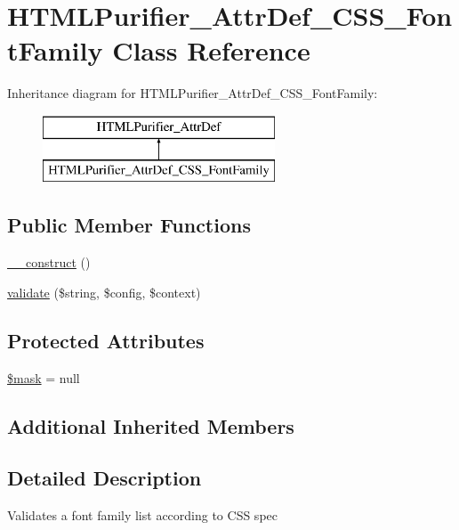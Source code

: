 \hypertarget{classHTMLPurifier__AttrDef__CSS__FontFamily}{\section{H\+T\+M\+L\+Purifier\+\_\+\+Attr\+Def\+\_\+\+C\+S\+S\+\_\+\+Font\+Family Class Reference}
\label{classHTMLPurifier__AttrDef__CSS__FontFamily}
}
Inheritance diagram for H\+T\+M\+L\+Purifier\+\_\+\+Attr\+Def\+\_\+\+C\+S\+S\+\_\+\+Font\+Family\+:\begin{figure}[H]
\begin{center}
\leavevmode
\includegraphics[height=2.000000cm]{classHTMLPurifier__AttrDef__CSS__FontFamily}
\end{center}
\end{figure}
\subsection*{Public Member Functions}
\begin{DoxyCompactItemize}
\item 
\hyperlink{classHTMLPurifier__AttrDef__CSS__FontFamily_a285d211f6841685e937afaf4f8cb225f}{\+\_\+\+\_\+construct} ()
\item 
\hyperlink{classHTMLPurifier__AttrDef__CSS__FontFamily_adaf9df746058627ec0c049430fb7ad5d}{validate} (\$string, \$config, \$context)
\end{DoxyCompactItemize}
\subsection*{Protected Attributes}
\begin{DoxyCompactItemize}
\item 
\hyperlink{classHTMLPurifier__AttrDef__CSS__FontFamily_ad4bc4fe0cf0e0873eab19f9a94163c4c}{\$mask} = null
\end{DoxyCompactItemize}
\subsection*{Additional Inherited Members}


\subsection{Detailed Description}
Validates a font family list according to C\+S\+S spec 

